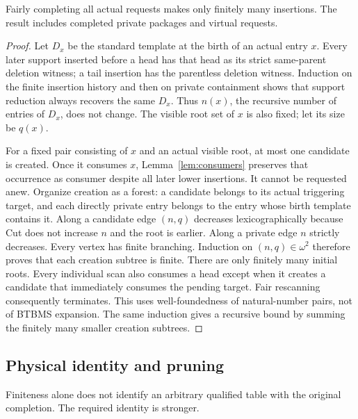 \begin{theorem}\label{thm:completion}
Fairly completing all actual requests makes only finitely many
insertions. The result includes completed private packages and virtual
requests.
\end{theorem}
\begin{proof}
Let $D_x$ be the standard template at the birth of an actual entry $x$.
Every later support inserted before a head has that head as its strict
same-parent deletion witness; a tail insertion has the parentless
deletion witness. Induction on the finite insertion history and then
on private containment shows that support reduction always recovers
the same $D_x$. Thus $n(x)$, the recursive number of entries of $D_x$,
does not change. The visible root set of $x$ is also fixed; let its size
be $q(x)$.

For a fixed pair consisting of $x$ and an actual visible root, at most
one candidate is created. Once it consumes $x$,
Lemma~\ref{lem:consumers} preserves that occurrence as consumer despite
all later lower insertions. It cannot be requested anew.
Organize creation as a forest: a candidate belongs to its actual
triggering target, and each directly private entry belongs to the
entry whose birth template contains it. Along a candidate edge
$(n,q)$ decreases lexicographically because Cut does not increase $n$
and the root is earlier. Along a private edge $n$ strictly decreases.
Every vertex has finite branching. Induction on $(n,q)\in\omega^2$
therefore proves that each creation subtree is finite. There are only
finitely many initial roots. Every individual scan also consumes a
head except when it creates a candidate that immediately consumes the
pending target. Fair rescanning consequently terminates. This uses
well-foundedness of natural-number pairs, not of BTBMS expansion.
The same induction gives a recursive bound by summing the finitely
many smaller creation subtrees.
\end{proof}



\subsection{Physical identity and pruning}
Finiteness alone does not identify an arbitrary qualified table with the
original completion. The required identity is stronger.

